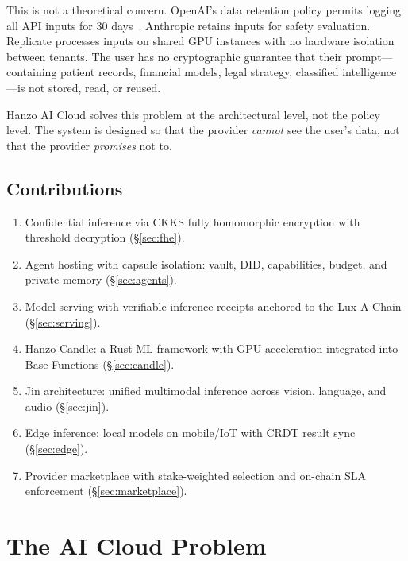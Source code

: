 \documentclass[11pt]{article}
\begin{document}
This is not a theoretical concern. OpenAI's data retention policy permits
logging all API inputs for 30 days~\cite{openaiapi}. Anthropic retains inputs
for safety evaluation. Replicate processes inputs on shared GPU instances with
no hardware isolation between tenants. The user has no cryptographic guarantee
that their prompt---containing patient records, financial models, legal
strategy, classified intelligence---is not stored, read, or reused.

Hanzo AI Cloud solves this problem at the architectural level, not the policy
level. The system is designed so that the provider \emph{cannot} see the
user's data, not that the provider \emph{promises} not to.

\subsection{Contributions}

\begin{enumerate}[leftmargin=1.4em]
    \item Confidential inference via CKKS fully homomorphic encryption with
    threshold decryption (\S\ref{sec:fhe}).
    \item Agent hosting with capsule isolation: vault, DID, capabilities,
    budget, and private memory (\S\ref{sec:agents}).
    \item Model serving with verifiable inference receipts anchored to the
    Lux A-Chain (\S\ref{sec:serving}).
    \item Hanzo Candle: a Rust ML framework with GPU acceleration integrated
    into Base Functions (\S\ref{sec:candle}).
    \item Jin architecture: unified multimodal inference across vision,
    language, and audio (\S\ref{sec:jin}).
    \item Edge inference: local models on mobile/IoT with CRDT result sync
    (\S\ref{sec:edge}).
    \item Provider marketplace with stake-weighted selection and on-chain SLA
    enforcement (\S\ref{sec:marketplace}).
\end{enumerate}

\section{The AI Cloud Problem}
\label{sec:problem}
\end{document}

